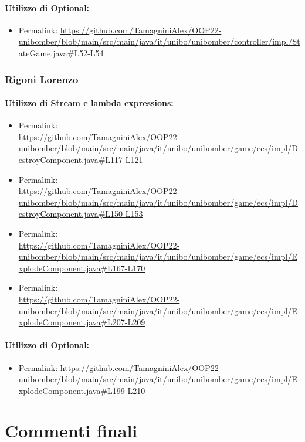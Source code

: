 \documentclass[a4paper,12pt]{report}
\begin{document}
\subsubsection*{Utilizzo di Optional:}
\begin{itemize}
    \item Permalink: \url{https://github.com/TamagniniAlex/OOP22-unibomber/blob/main/src/main/java/it/unibo/unibomber/controller/impl/StateGame.java#L52-L54}
\end{itemize}
\subsection*{Rigoni Lorenzo}
\subsubsection*{Utilizzo di Stream e lambda expressions:}
\begin{itemize}
    \item Permalink: 
    \\ \url{https://github.com/TamagniniAlex/OOP22-unibomber/blob/main/src/main/java/it/unibo/unibomber/game/ecs/impl/DestroyComponent.java#L117-L121}
    \item Permalink: 
    \\\url{https://github.com/TamagniniAlex/OOP22-unibomber/blob/main/src/main/java/it/unibo/unibomber/game/ecs/impl/DestroyComponent.java#L150-L153}
    \item Permalink: 
    \\\url{https://github.com/TamagniniAlex/OOP22-unibomber/blob/main/src/main/java/it/unibo/unibomber/game/ecs/impl/ExplodeComponent.java#L167-L170}
    \item Permalink: 
    \\\url{https://github.com/TamagniniAlex/OOP22-unibomber/blob/main/src/main/java/it/unibo/unibomber/game/ecs/impl/ExplodeComponent.java#L207-L209}
\end{itemize}
\subsubsection*{Utilizzo di Optional:}
\begin{itemize}
    \item Permalink: \url{https://github.com/TamagniniAlex/OOP22-unibomber/blob/main/src/main/java/it/unibo/unibomber/game/ecs/impl/ExplodeComponent.java#L199-L210}
\end{itemize}

\chapter{Commenti finali}
\end{document}
